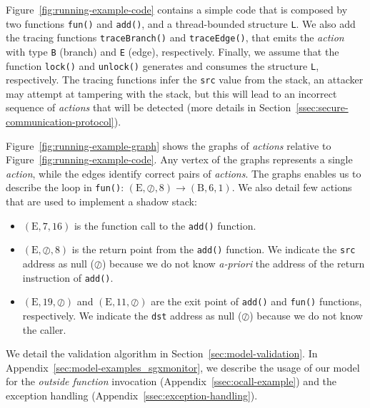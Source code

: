 Figure~\ref{fig:running-example-code} contains a simple code that is composed 
by two functions \texttt{fun()} and \texttt{add()}, and a thread-bounded 
structure \texttt{L}.
We also add the tracing functions \texttt{traceBranch()} and 
\texttt{traceEdge()}, that emits the \emph{action} with type \texttt{B} 
(branch) and \texttt{E} (edge), respectively.
Finally, we assume that the function \texttt{lock()} and \texttt{unlock()} 
generates and consumes the structure \texttt{L}, respectively.
The tracing functions infer the \texttt{src} value from the 
stack, an attacker may attempt at tampering with the stack, but this will lead 
to an incorrect sequence of \emph{actions} that will be detected (more details 
in Section~\ref{ssec:secure-communication-protocol}).

Figure~\ref{fig:running-example-graph} shows the graphs of \emph{actions} 
relative to Figure~\ref{fig:running-example-code}.
Any vertex of the graphs represents a single \emph{action}, while the edges 
identify correct pairs of \emph{actions}.
The graphs enables us to describe the loop in \texttt{fun()}: $(\text{E}, 
\oslash, 8) \rightarrow (\text{B}, 6, 1)$.
We also detail few actions that are used to implement a shadow stack:
\begin{itemize}
	\item $(\text{E}, 7, 16)$ is the function call to the \texttt{add()} 
	function.
	
	\item $(\text{E}, \oslash, 8)$ is the return point from the \texttt{add()} 
	function. We indicate the \texttt{src} address as null (\ie $\oslash$) 
	because we do not know \emph{a-priori} the address of the return 
	instruction of \texttt{add()}.
	
	\item $(\text{E}, 19, \oslash)$ and $(\text{E}, 11, \oslash)$  are the exit 
	point of \texttt{add()} and \texttt{fun()} functions, respectively.
	We indicate the \texttt{dst} address as null (\ie $\oslash$) because we do 
	not know the caller.
\end{itemize}
We detail the validation algorithm in Section~\ref{sec:model-validation}.
In Appendix~\ref{sec:model-examples_sgxmonitor}, we describe the usage of our 
model for the \emph{outside function} invocation 
(Appendix~\ref{ssec:ocall-example}) and the exception handling 
(Appendix~\ref{ssec:exception-handling}).

